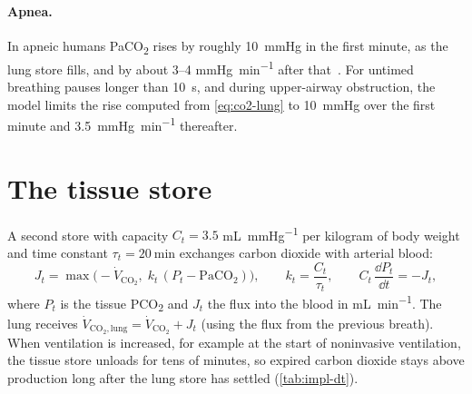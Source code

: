 \paragraph{Apnea.} In apneic humans PaCO\textsubscript{2} rises by roughly \SI{10}{\mmHg} in the first minute, as the lung store fills, and by about 3--4 \si{\mmHg\per\minute} after that~\citep{eger1961,stock1988}. For untimed breathing pauses longer than \SI{10}{\second}, and during upper-airway obstruction, the model limits the rise computed from \cref{eq:co2-lung} to \SI{10}{\mmHg} over the first minute and \SI{3.5}{\mmHg\per\minute} thereafter.

\section{The tissue store}
\label{sec:co2-tissue}
A second store with capacity $C_t = 3.5$ \si{\milli\liter\per\mmHg} per kilogram of body weight and time constant $\tau_t = \SI{20}{\minute}$ exchanges carbon dioxide with arterial blood:
\begin{equation}
J_t = \max\bigl(-\dot V_{\mathrm{CO_2}},\;k_t\,(P_t - \mathrm{PaCO_2})\bigr),\qquad k_t = \frac{C_t}{\tau_t},\qquad
C_t\,\frac{\dd P_t}{\dd t} = -J_t,
\label{eq:co2-tissue}
\end{equation}
where $P_t$ is the tissue PCO\textsubscript{2} and $J_t$ the flux into the blood in \si{\milli\liter\per\minute}. The lung receives $\dot V_{\mathrm{CO_2,lung}} = \dot V_{\mathrm{CO_2}} + J_t$ (using the flux from the previous breath). When ventilation is increased, for example at the start of noninvasive ventilation, the tissue store unloads for tens of minutes, so expired carbon dioxide stays above production long after the lung store has settled (\cref{tab:impl-dt}).


